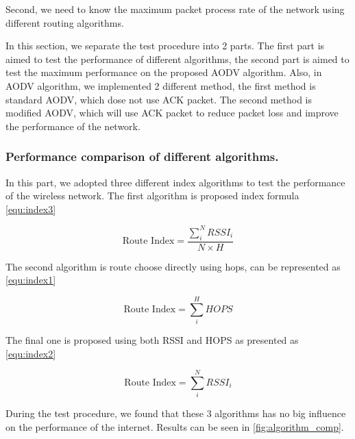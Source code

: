 Second, we need to know the maximum packet process rate of the network using different routing algorithms.

In this section, we separate the test procedure into 2 parts. The first part is aimed to test the performance of different algorithms, the second part is aimed to test the maximum performance on the proposed AODV algorithm. Also, in AODV algorithm, we implemented 2 different method, the first method is standard AODV, which dose not use ACK packet. The second method is modified AODV, which will use ACK packet to reduce packet loss and improve the performance of the network.

\subsubsection{Performance comparison of different algorithms.}

In this part, we adopted three different index algorithms to test the performance of the wireless network.
The first algorithm is proposed index formula \ref{equ:index3}

\begin{equation}
    \text{Route Index} = 
    \frac{\sum_i^N{RSSI_i}}{N \times H}
\label{equ:index3}
\end{equation}

The second algorithm is route choose directly using hops, can be represented as \ref{equ:index1}

\begin{equation}
    \text{Route Index} = 
    {\sum_i^H HOPS}
\label{equ:index1}
\end{equation}

The final one is proposed using both RSSI and HOPS as presented as \ref{equ:index2}

\begin{equation}
    \text{Route Index} = 
    {\sum_i^N{RSSI_i}}
\label{equ:index2}
\end{equation}

During the test procedure, we found that these 3 algorithms has no big influence on  the performance of the internet. Results can be seen in \ref{fig:algorithm_comp}. 

